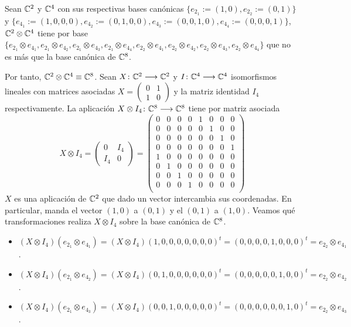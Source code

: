 \begin{example} Sean $\mathbb{C}^2$ y $\mathbb{C}^4$ con sus respectivas bases canónicas $\{e_{2_1}:=(1,0),e_{2_2}:=(0,1)\}$ y $\{e_{4_1}:=(1,0,0,0),e_{4_2}:=(0,1,0,0), e_{4_3}:=(0,0,1,0),e_{4_4}:=(0,0,0,1)\}$, $\mathbb{C}^2\otimes\mathbb{C}^4$ tiene por base $\{e_{2_1}\otimes e_{4_1},e_{2_1}\otimes e_{4_2},e_{2_1}\otimes e_{4_3},e_{2_1}\otimes e_{4_4},e_{2_2}\otimes e_{4_1},e_{2_2}\otimes e_{4_2},e_{2_2}\otimes e_{4_3},e_{2_2}\otimes e_{4_4}\}$ que no es más que la base canónica de $\mathbb{C}^8$.

Por tanto, $\mathbb{C}^2\otimes\mathbb{C}^4\equiv\mathbb{C}^8$. Sean $X\colon \mathbb{C}^2\longrightarrow \mathbb{C}^2$ y $I\colon \mathbb{C}^4\longrightarrow \mathbb{C}^4$ isomorfismos lineales con matrices asociadas $X=\left(\begin{matrix}
0&1\\1&0\end{matrix}\right)$ y la matriz identidad $I_4$ respectivamente. La aplicación $X\otimes I_4\colon \mathbb{C}^8\longrightarrow \mathbb{C}^8$ tiene por matriz asociada
\begin{equation}
X\otimes I_4=
\left(\begin{matrix}
0&I_4\\
I_4&0
\end{matrix}\right)
=
\left(\begin{matrix}
0&0&0&0&1&0&0&0\\
0&0&0&0&0&1&0&0\\
0&0&0&0&0&0&1&0\\
0&0&0&0&0&0&0&1\\
1&0&0&0&0&0&0&0\\
0&1&0&0&0&0&0&0\\
0&0&1&0&0&0&0&0\\
0&0&0&1&0&0&0&0\\
\end{matrix}\right)
\end{equation}
$X$ es una aplicación de $\mathbb{C}^2$ que dado un vector intercambia sus coordenadas. En particular, manda el vector $(1,0)$ a $(0,1)$ y el $(0,1)$ a $(1,0)$. Veamos qué transformaciones realiza $X\otimes I_4$ sobre la base canónica de $\mathbb{C}^8$.
\begin{itemize}
\item $(X\otimes I_4)(e_{2_1}\otimes e_{4_1})=(X\otimes I_4)(1,0,0,0,0,0,0,0)^t=(0,0,0,0,1,0,0,0)^t = e_{2_2}\otimes e_{4_1}$.
\item $(X\otimes I_4)(e_{2_1}\otimes e_{4_2})=(X\otimes I_4)(0,1,0,0,0,0,0,0)^t=(0,0,0,0,0,1,0,0)^t = e_{2_2}\otimes e_{4_2}$.
\item $(X\otimes I_4)(e_{2_1}\otimes e_{4_3})=(X\otimes I_4)(0,0,1,0,0,0,0,0)^t=(0,0,0,0,0,0,1,0)^t = e_{2_2}\otimes e_{4_3}$.

\end{itemize}
\end{example}
